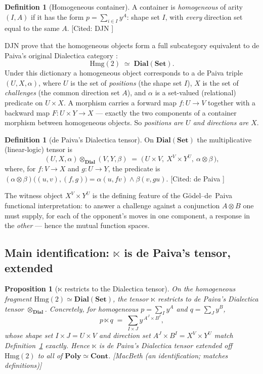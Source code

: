 \documentclass[11pt,a4paper]{article}
\newcommand{\Set}{\mathbf{Set}}
\newcommand{\Cont}{\mathbf{Cont}}
\newcommand{\Poly}{\mathbf{Poly}}
\newcommand{\Dial}{\mathbf{Dial}}
\newcommand{\Hmg}{\mathrm{Hmg}}
\newcommand{\dtens}{\mathbin{\otimes_{\Dial}}}
\theoremstyle{plain}
\newtheorem{Proposition}[Theorem]{Proposition}
\theoremstyle{definition}
\newtheorem{Definition}[Theorem]{Definition}
\theoremstyle{remark}
\newcommand{\prov}[1]{\hfill\textsf{\footnotesize[#1]}}
\begin{document}
\begin{Definition}[Homogeneous container]
\label{def:homogeneous}
A container is \emph{homogeneous} of arity $(I,A)$ if it has the form
$p=\sum_{i\in I}y^{A}$: shape set $I$, with \emph{every} direction set equal to
the same $A$.
\prov{Cited: DJN \cite[\S2]{DJN23}}
\end{Definition}

DJN prove that the homogeneous objects form a full subcategory equivalent to de
Paiva's original Dialectica category
\cite[Prop.~2.13]{DJN23}:
\[
  \Hmg(2)\;\simeq\;\Dial(\Set).
\]
Under this dictionary a homogeneous object corresponds to a de Paiva triple
$(U,X,\alpha)$, where $U$ is the set of \emph{positions} (the shape set $I$),
$X$ is the set of \emph{challenges} (the common direction set $A$), and $\alpha$
is a set-valued (relational) predicate on $U\times X$. A morphism carries a
forward map $f\colon U\to V$ together with a backward map $F\colon U\times Y\to
X$ --- exactly the two components of a container morphism between homogeneous
objects. So \emph{positions are $U$ and directions are $X$}.

\begin{Definition}[de Paiva's Dialectica tensor]
\label{def:depaiva-tensor}
On $\Dial(\Set)$ the multiplicative (linear-logic) tensor is
\[
  (U,X,\alpha)\dtens(V,Y,\beta)
    \;=\;\bigl(\,U\times V,\ X^{V}\times Y^{U},\ \alpha\otimes\beta\,\bigr),
\]
where, for $f\colon V\to X$ and $g\colon U\to Y$, the predicate is
$(\alpha\otimes\beta)\bigl((u,v),(f,g)\bigr)=\alpha(u,f v)\wedge\beta(v,g u)$.
\prov{Cited: de Paiva \cite{depaiva89}}
\end{Definition}

The witness object $X^{V}\times Y^{U}$ is the defining feature of the
Gödel--de~Paiva functional interpretation: to answer a challenge against a
conjunction $A\otimes B$ one must supply, for each of the opponent's moves in
one component, a response in the \emph{other} --- hence the mutual function
spaces.

\subsection{Main identification: $\ltimes$ is de Paiva's tensor, extended}
\label{sec:dia-main}

\begin{Proposition}[$\ltimes$ restricts to the Dialectica tensor]
\label{prop:ltimes-is-dial}
On the homogeneous fragment $\Hmg(2)\simeq\Dial(\Set)$, the tensor $\ltimes$
restricts to de Paiva's Dialectica tensor $\dtens$. Concretely, for homogeneous
$p=\sum_{I}y^{A}$ and $q=\sum_{J}y^{B}$,
\[
  p\ltimes q \;=\;\sum_{I\times J} y^{\,A^{J}\times B^{I}},
\]
whose shape set $I\times J=U\times V$ and direction set
$A^{J}\times B^{I}=X^{V}\times Y^{U}$ match Definition~\ref{def:depaiva-tensor}
exactly. Hence $\ltimes$ is de Paiva's Dialectica tensor extended off
$\Hmg(2)$ to all of $\Poly\simeq\Cont$.
\prov{MacBeth (an identification; matches definitions)}
\end{Proposition}
\end{document}
